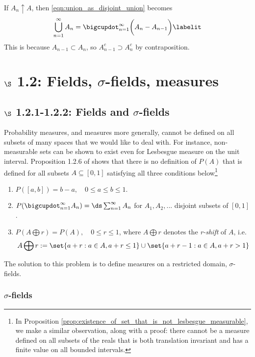 \documentclass{article} %
\newcommand{\sfs}{$\sigma$-fields}
\begin{document}
\begin{remark}
If $A_n \uparrow A$, then \eqref{eqn:union_as_disjoint_union} becomes
\begin{align*}
	\bigcup_{n=1}^\infty A_n = \bigcupdot_{n=1}^\infty \bigg( A_n - A_{n-1} \bigg) 
\labelit \label{eqn:union_as_disjoint_union_for_increasing_sequences}
\end{align*}
This is because $A_{n-1} \subset A_{n}$, so $A_{n-1}^c \supset A_{n}^c$ by contraposition.	
\end{remark}

\section{$\S$ 1.2: Fields, \sfs, measures}

\subsection{$\S$ 1.2.1-1.2.2: Fields and \sfs}

Probability measures, and measures more generally, cannot be defined on all subsets of many spaces that we would like to deal with.  For instance, non-measurable sets can be shown to exist even for Lesbesgue measure on the unit interval.  Proposition 1.2.6 of \cite{rosenthal2006first} shows that there is no definition of $P(A)$ that is defined for all subsets $A \subseteq [0,1]$ satisfying all three conditions below\footnote{In Proposition \ref{prop:existence_of_set_that_is_not_lesbesgue_measurable}, we make a similar observation, along with a proof: there cannot be a measure defined on all subsets of the reals that is both translation invariant and has a finite value on all bounded intervals.}
\begin{enumerate}
\item $P([a,b]) = b-a, \quad 0 \leq a \leq b \leq 1$.	
\item $P(\bigcupdot_{n=1}^\infty A_n ) = \ds\sum_{n=1}^\infty A_n$ for $A_1, A_2, ...$ disjoint subsets of $[0,1]$.
\item $P(A \bigoplus r) = P(A), \quad 0 \leq r \leq 1$, where $A \bigoplus r$ denotes the \textit{r-shift} of $A$, i.e. 
\[ A \bigoplus r := \set{a+r : a \in A, a+r \leq 1} \cup \set{a+r-1 : a \in A, a +r >1}\]
\end{enumerate}

The solution to this problem is to define measures on a restricted domain, $\sigma$-fields.

\subsubsection{$\sigma$-fields}
\end{document}

